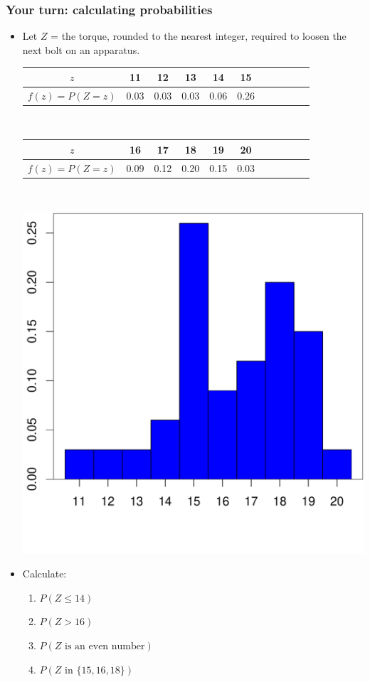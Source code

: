 \documentclass[handout]{beamer}\usepackage[]{graphicx}\usepackage[]{color}
\newenvironment{knitrout}{}{} %
\providecommand{\q}{$\quad$ \newline}
\numberwithin{equation}{section}
\begin{document}
\begin{frame}
\frametitle{Your turn: calculating probabilities} \scriptsize
\begin{itemize}
\item Let $Z$ = the torque, rounded to the nearest integer, required to loosen the next bolt on an apparatus. \q 


\begin{center}
\begin{tabular}{ccccccccccc}
$z$ & 11 & 12 & 13 & 14 & 15 \\ \hline
$f(z) = P(Z = z)$ & 0.03 & 0.03 & 0.03 & 0.06 & 0.26 
\end{tabular} \q

\begin{tabular}{ccccccccccc}
$z$ & 16 & 17 & 18 & 19 & 20 \\ \hline
$f(z) = P(Z = z)$ &  0.09 & 0.12 & 0.20 & 0.15 & 0.03 
\end{tabular} \q \q

\begin{knitrout}
\color{fgcolor}
\includegraphics[width=.4\textwidth,height=.3\textheight]{figure/unnamed-chunk-5-1} 

\end{knitrout}
\end{center}
\item Calculate:
\begin{enumerate}[1. ]
\item $P(Z \le 14)$
\item $P(Z > 16)$
\item $P(Z \text{ is an even number})$
\item $P(Z \text{ in } \{15, 16, 18\})$
\end{enumerate}
\end{itemize}
\end{frame}
\end{document}
